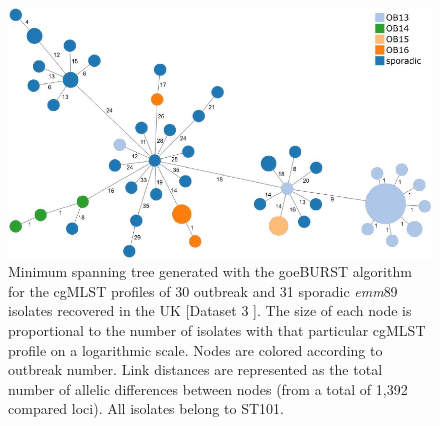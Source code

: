 \newpage
\begin{figure}[h!]
    \centering
    \includegraphics[angle=0,width=\textwidth]{figures/chapter 4/FigureS13.pdf}
    \caption[Minimum spanning tree generated with the goeBURST algorithm for the cgMLST profiles of 30 outbreak and 31 sporadic \textit{emm}89 isolates recovered in the UK.]{Minimum spanning tree generated with the goeBURST algorithm for the \ac{cgMLST} profiles of 30 outbreak and 31 sporadic \textit{emm}89 isolates recovered in the UK \cite{coelho_genomic_2019} [Dataset 3 \cite{friaes_supplemental_2023}]. The size of each node is proportional to the number of isolates with that particular \ac{cgMLST} profile on a logarithmic scale. Nodes are colored according to outbreak number. Link distances are represented as the total number of allelic differences between nodes (from a total of 1,392 compared loci). All isolates belong to \ac{ST}101.}
    \label{fig:chap4_figureS13}
\end{figure}

